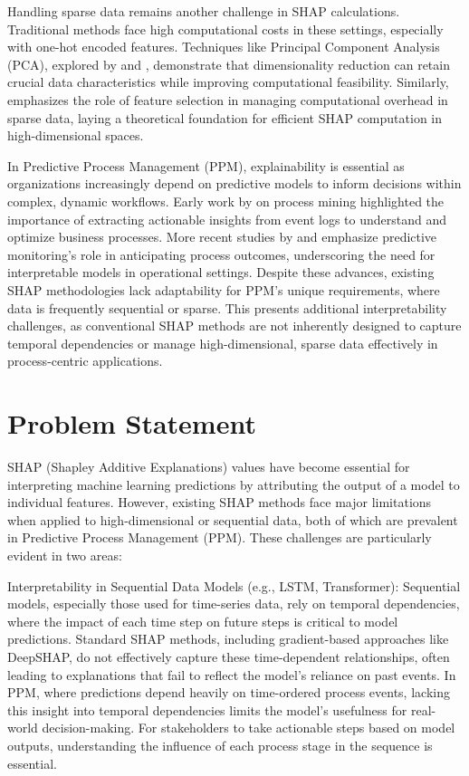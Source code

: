 Handling sparse data remains another challenge in SHAP calculations. Traditional methods face high computational costs in these settings, especially with one-hot encoded features. Techniques like Principal Component Analysis (PCA), explored by \cite{jolliffe2002principal} and \cite{ng2004feature}, demonstrate that dimensionality reduction can retain crucial data characteristics while improving computational feasibility. Similarly, \cite{murphy2012machine} emphasizes the role of feature selection in managing computational overhead in sparse data, laying a theoretical foundation for efficient SHAP computation in high-dimensional spaces.

In Predictive Process Management (PPM), explainability is essential as organizations increasingly depend on predictive models to inform decisions within complex, dynamic workflows. Early work by \cite{der2011discovery} on process mining highlighted the importance of extracting actionable insights from event logs to understand and optimize business processes. More recent studies by \cite{de2016general} and \cite{di2018predictive} emphasize predictive monitoring's role in anticipating process outcomes, underscoring the need for interpretable models in operational settings. Despite these advances, existing SHAP methodologies lack adaptability for PPM’s unique requirements, where data is frequently sequential or sparse. This presents additional interpretability challenges, as conventional SHAP methods are not inherently designed to capture temporal dependencies or manage high-dimensional, sparse data effectively in process-centric applications.

\section{Problem Statement}

SHAP (Shapley Additive Explanations) values have become essential for interpreting machine learning predictions by attributing the output of a model to individual features. However, existing SHAP methods face major limitations when applied to high-dimensional or sequential data, both of which are prevalent in Predictive Process Management (PPM). These challenges are particularly evident in two areas:

Interpretability in Sequential Data Models (e.g., LSTM, Transformer): Sequential models, especially those used for time-series data, rely on temporal dependencies, where the impact of each time step on future steps is critical to model predictions. Standard SHAP methods, including gradient-based approaches like DeepSHAP, do not effectively capture these time-dependent relationships, often leading to explanations that fail to reflect the model’s reliance on past events. In PPM, where predictions depend heavily on time-ordered process events, lacking this insight into temporal dependencies limits the model’s usefulness for real-world decision-making. For stakeholders to take actionable steps based on model outputs, understanding the influence of each process stage in the sequence is essential.

